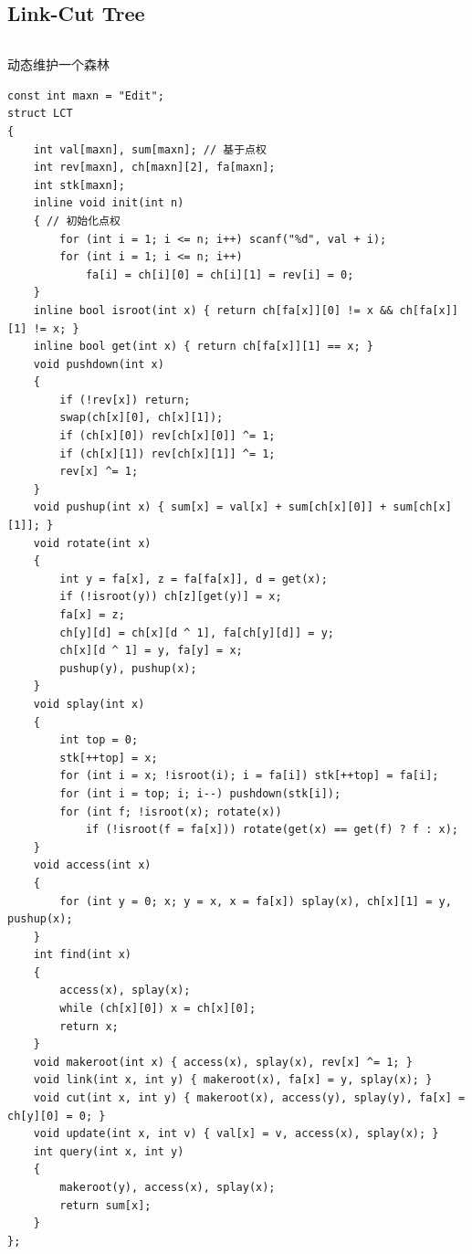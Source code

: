\documentclass[twoside]{article}
\begin{document}
\subsection{Link-Cut Tree}
\begin{lstlisting}
\end{lstlisting}
动态维护一个森林
\begin{lstlisting}
const int maxn = "Edit";
struct LCT
{
    int val[maxn], sum[maxn]; // 基于点权
    int rev[maxn], ch[maxn][2], fa[maxn];
    int stk[maxn];
    inline void init(int n)
    { // 初始化点权
        for (int i = 1; i <= n; i++) scanf("%d", val + i);
        for (int i = 1; i <= n; i++)
            fa[i] = ch[i][0] = ch[i][1] = rev[i] = 0;
    }
    inline bool isroot(int x) { return ch[fa[x]][0] != x && ch[fa[x]][1] != x; }
    inline bool get(int x) { return ch[fa[x]][1] == x; }
    void pushdown(int x)
    {
        if (!rev[x]) return;
        swap(ch[x][0], ch[x][1]);
        if (ch[x][0]) rev[ch[x][0]] ^= 1;
        if (ch[x][1]) rev[ch[x][1]] ^= 1;
        rev[x] ^= 1;
    }
    void pushup(int x) { sum[x] = val[x] + sum[ch[x][0]] + sum[ch[x][1]]; }
    void rotate(int x)
    {
        int y = fa[x], z = fa[fa[x]], d = get(x);
        if (!isroot(y)) ch[z][get(y)] = x;
        fa[x] = z;
        ch[y][d] = ch[x][d ^ 1], fa[ch[y][d]] = y;
        ch[x][d ^ 1] = y, fa[y] = x;
        pushup(y), pushup(x);
    }
    void splay(int x)
    {
        int top = 0;
        stk[++top] = x;
        for (int i = x; !isroot(i); i = fa[i]) stk[++top] = fa[i];
        for (int i = top; i; i--) pushdown(stk[i]);
        for (int f; !isroot(x); rotate(x))
            if (!isroot(f = fa[x])) rotate(get(x) == get(f) ? f : x);
    }
    void access(int x)
    {
        for (int y = 0; x; y = x, x = fa[x]) splay(x), ch[x][1] = y, pushup(x);
    }
    int find(int x)
    {
        access(x), splay(x);
        while (ch[x][0]) x = ch[x][0];
        return x;
    }
    void makeroot(int x) { access(x), splay(x), rev[x] ^= 1; }
    void link(int x, int y) { makeroot(x), fa[x] = y, splay(x); }
    void cut(int x, int y) { makeroot(x), access(y), splay(y), fa[x] = ch[y][0] = 0; }
    void update(int x, int v) { val[x] = v, access(x), splay(x); }
    int query(int x, int y)
    {
        makeroot(y), access(x), splay(x);
        return sum[x];
    }
};
\end{lstlisting}
\end{document}
